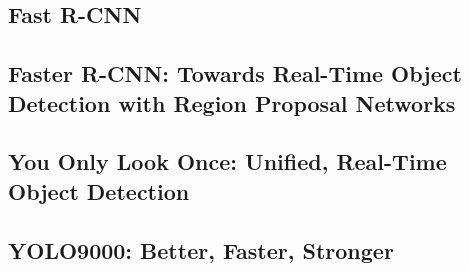 \documentclass[a4paper,12pt]{article}
\begin{document}
\subsection{Fast R-CNN\cite{DBLP:conf/iccv/Girshick15}}
\subsection{Faster R-CNN: Towards Real-Time Object Detection with Region Proposal
               Networks\cite{DBLP:conf/nips/RenHGS15}}
\subsection{You Only Look Once: Unified, Real-Time Object Detection\cite{DBLP:journals/corr/RedmonDGF15}}
\subsection{YOLO9000: Better, Faster, Stronger\cite{DBLP:journals/corr/RedmonF16}}

               


  
 
\end{document}
